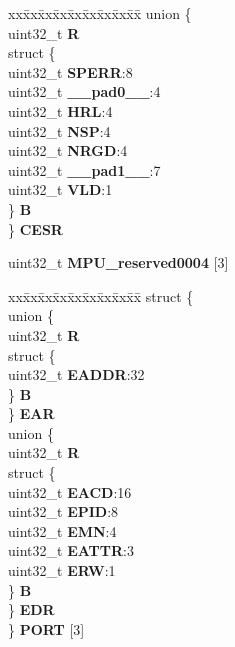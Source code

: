 \begin{DoxyCompactItemize}
\begin{tabbing}
\end{tabbing}\item 
\mbox{\label{structMPU__tag_afc37a6738fa056543e1a6b20dbd58927}} 
\begin{tabbing}
xx\=xx\=xx\=xx\=xx\=xx\=xx\=xx\=xx\=\kill
union \{\\
\>uint32\_t {\bfseries R}\\
\>struct \{\\
\>\>uint32\_t {\bfseries SPERR}:8\\
\>\>uint32\_t {\bfseries \_\_pad0\_\_}:4\\
\>\>uint32\_t {\bfseries HRL}:4\\
\>\>uint32\_t {\bfseries NSP}:4\\
\>\>uint32\_t {\bfseries NRGD}:4\\
\>\>uint32\_t {\bfseries \_\_pad1\_\_}:7\\
\>\>uint32\_t {\bfseries VLD}:1\\
\>\} {\bfseries B}\\
\} {\bfseries CESR}\\

\end{tabbing}\item 
\mbox{\label{structMPU__tag_ad2dca73b8887c3db9e9408e34d43cf11}} 
uint32\+\_\+t {\bfseries M\+P\+U\+\_\+reserved0004} \mbox{[}3\mbox{]}
\item 
\mbox{\label{structMPU__tag_adcf2d0ca98539a2c5a1cd4b8c3826bf8}} 
\begin{tabbing}
xx\=xx\=xx\=xx\=xx\=xx\=xx\=xx\=xx\=\kill
struct \{\\
\>union \{\\
\>\>uint32\_t {\bfseries R}\\
\>\>struct \{\\
\>\>\>uint32\_t {\bfseries EADDR}:32\\
\>\>\} {\bfseries B}\\
\>\} {\bfseries EAR}\\
\>union \{\\
\>\>uint32\_t {\bfseries R}\\
\>\>struct \{\\
\>\>\>uint32\_t {\bfseries EACD}:16\\
\>\>\>uint32\_t {\bfseries EPID}:8\\
\>\>\>uint32\_t {\bfseries EMN}:4\\
\>\>\>uint32\_t {\bfseries EATTR}:3\\
\>\>\>uint32\_t {\bfseries ERW}:1\\
\>\>\} {\bfseries B}\\
\>\} {\bfseries EDR}\\
\} {\bfseries PORT} \mbox{[}3\mbox{]}\\


\end{tabbing}
\end{DoxyCompactItemize}
